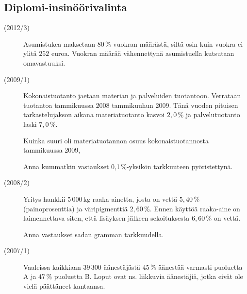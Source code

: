 \subsection*{Diplomi-insinöörivalinta}
\begin{description}
	\item[(2012/3)] Asumistukea maksetaan $80$\,\% vuokran määrästä, siltä osin kuin
        vuokra ei ylitä $252$ euroa. Vuokran määrää vähennettynä asumistuella
        kutsutaan omavastuuksi.
        
	
	\item[(2009/1)] Kokonaistuotanto jaetaan materian ja palveluiden tuotantoon. Verrataan tuotantoa tammikuussa 2008 tammikuuhun 2009. Tänä vuoden pituisen tarkastelujakson aikana materiatuotanto kasvoi $2,0$\,\% ja palvelutuotanto laski $7,0$\,\%.
	
	   Kuinka suuri oli materiatuotannon osuus kokonaistuotannosta tammikuussa 2009,
	   
    	
	   Anna kummatkin vastaukset 0,1\,\%-yksikön tarkkuuteen pyöristettynä.

	\item[(2008/2)] Yritys hankkii $5\,000$\,kg raaka-ainetta, josta on vettä $5,40$\,\% (painoprosenttia) ja väripigmenttiä $2,60$\,\%. Ennen käyttöä raaka-aine on laimennettava siten, että lisäyksen jälkeen sekoituksesta $6,60$\,\% on vettä.
	
    	
    	Anna vastaukset sadan gramman tarkkuudella.

	\item[(2007/1)] Vaaleissa kaikkiaan $39\,300$ äänestäjästä $45$\,\% äänestää varmasti puoluetta A ja $47$\,\% puoluetta B. Loput ovat ns. liikkuvia äänestäjiä, jotka eivät ole vielä päättäneet kantaansa.
	
\end{description}

